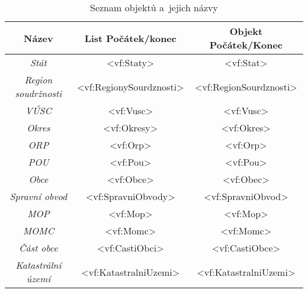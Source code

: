 \begin{table}[!h]
    \centering
    \caption{Seznam objektů a~jejich názvy}
    \label{tab:seznamObjektu}
    \begin{tabular}{|c|c|c|}
    \hline
    \textbf{Název}                       & \textbf{List Počátek/konec}                    & \textbf{Objekt Počátek/Konec}                 \\ \hline
    \textit{Stát}                        & \textless{}vf:Staty\textgreater{}              & \textless{}vf:Stat\textgreater{}              \\ \hline
    \textit{Region soudržnosti}          & \textless{}vf:RegionySourdznosti\textgreater{} & \textless{}vf:RegionSourdznosti\textgreater{} \\ \hline
    \textit{VÚSC}                        & \textless{}vf:Vusc\textgreater{}               & \textless{}vf:Vusc\textgreater{}              \\ \hline
    \textit{Okres}                       & \textless{}vf:Okresy\textgreater{}             & \textless{}vf:Okres\textgreater{}             \\ \hline
    \textit{ORP}                         & \textless{}vf:Orp\textgreater{}                & \textless{}vf:Orp\textgreater{}               \\ \hline
    \textit{POU}                         & \textless{}vf:Pou\textgreater{}                & \textless{}vf:Pou\textgreater{}               \\ \hline
    \textit{Obce}                        & \textless{}vf:Obce\textgreater{}               & \textless{}vf:Obec\textgreater{}              \\ \hline
    \textit{Spravní obvod}               & \textless{}vf:SpravniObvody\textgreater{}      & \textless{}vf:SpravniObvod\textgreater{}      \\ \hline
    \textit{MOP}                         & \textless{}vf:Mop\textgreater{}                & \textless{}vf:Mop\textgreater{}               \\ \hline
    \textit{MOMC}                        & \textless{}vf:Momc\textgreater{}               & \textless{}vf:Momc\textgreater{}              \\ \hline
    \textit{Část obce}                   & \textless{}vf:CastiObci\textgreater{}          & \textless{}vf:CastiObce\textgreater{}         \\ \hline
    \textit{Katastrální území}           & \textless{}vf:KatastralniUzemi\textgreater{}   & \textless{}vf:KatastralniUzemi\textgreater{}  \\ \hline

\end{tabular}
\end{table}
